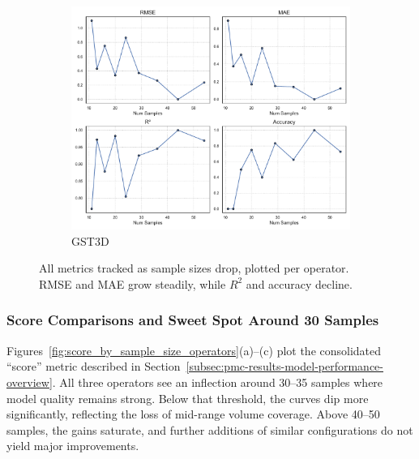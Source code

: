\begin{figure}[htbp]
    \hfill
    \begin{subfigure}[t]{0.32\textwidth}
        \includegraphics[width=\textwidth]{assets/images/05/metrics_evolution_by_sample_size_gst3d}
        \caption{\ac{GST3D}}
    \end{subfigure}
    \caption{All metrics tracked as sample sizes drop, plotted per operator.
    \ac{RMSE} and \ac{MAE} grow steadily, while $R^2$ and accuracy decline.}
    \label{fig:metrics_evolution_sample_size_operators}
\end{figure}

\subsubsection{Score Comparisons and Sweet Spot Around 30 Samples}
\label{subsec:score-comparisons-and-sweet-spot}

Figures~\ref{fig:score_by_sample_size_operators}(a)–(c) plot the consolidated “score” metric described in Section~\ref{subsec:pmc-results-model-performance-overview}.
All three operators see an inflection around 30–35 samples where model quality remains strong.
Below that threshold, the curves dip more significantly, reflecting the loss of mid-range volume coverage.
Above 40–50 samples, the gains saturate, and further additions of similar configurations do not yield major improvements.


